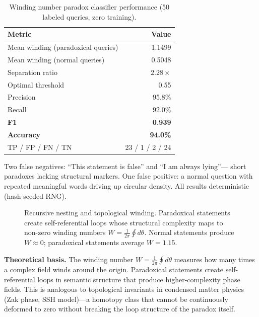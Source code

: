 \documentclass[11pt,a4paper]{article}
\begin{document}
\begin{table}[h]
\centering
\begin{tabular}{lr}
\toprule
Metric & Value \\
\midrule
Mean winding (paradoxical queries) & 1.1499 \\
Mean winding (normal queries)      & 0.5048 \\
Separation ratio                   & $2.28\times$ \\
Optimal threshold                  & 0.55 \\
Precision                          & 95.8\% \\
Recall                             & 92.0\% \\
\textbf{F1}                        & \textbf{0.939} \\
\textbf{Accuracy}                  & \textbf{94.0\%} \\
TP / FP / FN / TN                  & 23 / 1 / 2 / 24 \\
\bottomrule
\end{tabular}
\caption{Winding number paradox classifier performance (50 labeled queries,
zero training).}
\end{table}

Two false negatives: ``This statement is false'' and ``I am always lying''---
short paradoxes lacking structural markers. One false positive: a normal
question with repeated meaningful words driving up circular density. All
results deterministic (hash-seeded RNG).

\begin{figure}[h]
\centering

\caption{Recursive nesting and topological winding. Paradoxical statements
create self-referential loops whose structural complexity maps to non-zero
winding numbers $W = \frac{1}{2\pi}\oint d\theta$. Normal statements produce
$W \approx 0$; paradoxical statements average $W = 1.15$.}
\label{fig:recursive_nesting}
\end{figure}

\textbf{Theoretical basis.} The winding number
$W = \frac{1}{2\pi}\oint d\theta$ measures how many times a complex field
winds around the origin. Paradoxical statements create self-referential loops
in semantic structure that produce higher-complexity phase fields. This is
analogous to topological invariants in condensed matter physics (Zak phase,
SSH model)---a homotopy class that cannot be continuously deformed to zero
without breaking the loop structure of the paradox itself.
\end{document}
